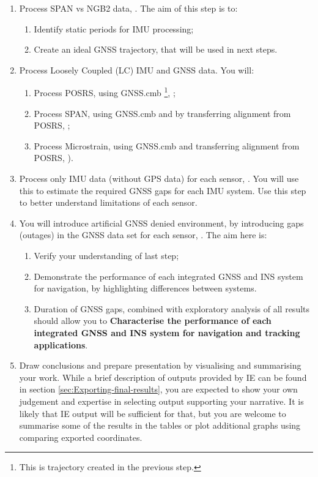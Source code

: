 \documentclass[british]{book}
\begin{document}
\begin{enumerate}
	\item Process SPAN vs NGB2 data, . The aim of this step is to: 
	\begin{enumerate}
		\item Identify static periods for IMU processing;
		\item Create an ideal GNSS trajectory, that will be used in next steps.
	\end{enumerate}
	\item Process Loosely Coupled (LC) IMU and GNSS data. You will:
	\begin{enumerate}
		\item Process POSRS, using GNSS.cmb \footnote{This is trajectory created in the previous step.}, ;
		\item Process SPAN, using GNSS.cmb and by transferring alignment from POSRS, ;
		\item Process Microstrain, using GNSS.cmb and transferring alignment from POSRS, ).
	\end{enumerate}
	\item Process only IMU data (without GPS data) for each sensor, . You will use this to estimate the required GNSS gaps for each IMU system. Use this step to better understand limitations of each sensor. 
	\item You will introduce artificial GNSS denied environment, by introducing gaps (outages) in the GNSS data set for each sensor, . The aim here is: 
	\begin{enumerate}
	\item Verify your understanding of last step;
	\item Demonstrate the performance of each integrated GNSS and INS system for navigation, by highlighting differences between systems.
	\item Duration of GNSS gaps, combined with exploratory analysis of all results should allow you to \textbf{Characterise the performance of each integrated GNSS and INS system for navigation and tracking applications}.
	\end{enumerate}
	\item Draw conclusions and prepare presentation by visualising and summarising your work. While a brief description of outputs provided by IE can be found in section \ref{sec:Exporting-final-results}, you are expected to show your own judgement and expertise in selecting output supporting your narrative. It is likely that IE output will be sufficient for that, but you are welcome to summarise some of the results in the tables or plot additional graphs using comparing exported coordinates.
\end{enumerate}
\end{document}
